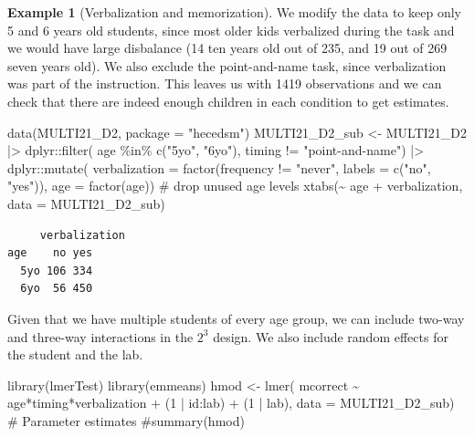\documentclass[
  11pt,
  letterpaper,
]{scrbook}
\newenvironment{Shaded}{\begin{snugshade}}{\end{snugshade}}
\newcommand{\AttributeTok}[1]{\textcolor[rgb]{0.40,0.45,0.13}{#1}}
\newcommand{\CommentTok}[1]{\textcolor[rgb]{0.37,0.37,0.37}{#1}}
\newcommand{\DecValTok}[1]{\textcolor[rgb]{0.68,0.00,0.00}{#1}}
\newcommand{\FunctionTok}[1]{\textcolor[rgb]{0.28,0.35,0.67}{#1}}
\newcommand{\NormalTok}[1]{\textcolor[rgb]{0.00,0.23,0.31}{#1}}
\newcommand{\OtherTok}[1]{\textcolor[rgb]{0.00,0.23,0.31}{#1}}
\newcommand{\SpecialCharTok}[1]{\textcolor[rgb]{0.37,0.37,0.37}{#1}}
\newcommand{\StringTok}[1]{\textcolor[rgb]{0.13,0.47,0.30}{#1}}
\theoremstyle{definition}
\newtheorem{example}{Example}[chapter]
\theoremstyle{remark}
\begin{document}
\begin{example}[Verbalization and
memorization]
We modify the data to keep only 5 and 6 years old students, since most
older kids verbalized during the task and we would have large disbalance
(14 ten years old out of 235, and 19 out of 269 seven years old). We
also exclude the point-and-name task, since verbalization was part of
the instruction. This leaves us with 1419 observations and we can check
that there are indeed enough children in each condition to get
estimates.

\begin{Shaded}
\begin{Highlighting}[]
\FunctionTok{data}\NormalTok{(MULTI21\_D2, }\AttributeTok{package =} \StringTok{"hecedsm"}\NormalTok{)}
\NormalTok{MULTI21\_D2\_sub }\OtherTok{\textless{}{-}}\NormalTok{ MULTI21\_D2 }\SpecialCharTok{|\textgreater{}}
\NormalTok{  dplyr}\SpecialCharTok{::}\FunctionTok{filter}\NormalTok{(}
\NormalTok{    age }\SpecialCharTok{\%in\%} \FunctionTok{c}\NormalTok{(}\StringTok{"5yo"}\NormalTok{, }\StringTok{"6yo"}\NormalTok{),}
\NormalTok{    timing }\SpecialCharTok{!=} \StringTok{"point{-}and{-}name"}\NormalTok{) }\SpecialCharTok{|\textgreater{}}
\NormalTok{  dplyr}\SpecialCharTok{::}\FunctionTok{mutate}\NormalTok{(}
    \AttributeTok{verbalization =} \FunctionTok{factor}\NormalTok{(frequency }\SpecialCharTok{!=} \StringTok{"never"}\NormalTok{,}
                           \AttributeTok{labels =} \FunctionTok{c}\NormalTok{(}\StringTok{"no"}\NormalTok{, }\StringTok{"yes"}\NormalTok{)),}
    \AttributeTok{age =} \FunctionTok{factor}\NormalTok{(age)) }\CommentTok{\# drop unused age levels}
\FunctionTok{xtabs}\NormalTok{(}\SpecialCharTok{\textasciitilde{}}\NormalTok{ age }\SpecialCharTok{+}\NormalTok{ verbalization, }\AttributeTok{data =}\NormalTok{ MULTI21\_D2\_sub)}
\end{Highlighting}
\end{Shaded}

\begin{verbatim}
     verbalization
age    no yes
  5yo 106 334
  6yo  56 450
\end{verbatim}

Given that we have multiple students of every age group, we can include
two-way and three-way interactions in the \(2^3\) design. We also
include random effects for the student and the lab.

\begin{Shaded}
\begin{Highlighting}[]
\FunctionTok{library}\NormalTok{(lmerTest)}
\FunctionTok{library}\NormalTok{(emmeans)}
\NormalTok{hmod }\OtherTok{\textless{}{-}} \FunctionTok{lmer}\NormalTok{(}
\NormalTok{  mcorrect }\SpecialCharTok{\textasciitilde{}}\NormalTok{ age}\SpecialCharTok{*}\NormalTok{timing}\SpecialCharTok{*}\NormalTok{verbalization }\SpecialCharTok{+}\NormalTok{ (}\DecValTok{1} \SpecialCharTok{|}\NormalTok{ id}\SpecialCharTok{:}\NormalTok{lab) }\SpecialCharTok{+}\NormalTok{ (}\DecValTok{1} \SpecialCharTok{|}\NormalTok{ lab), }
  \AttributeTok{data =}\NormalTok{ MULTI21\_D2\_sub)}
\CommentTok{\# Parameter estimates}
\CommentTok{\#summary(hmod)}
\end{Highlighting}
\end{Shaded}


\end{example}
\end{document}
